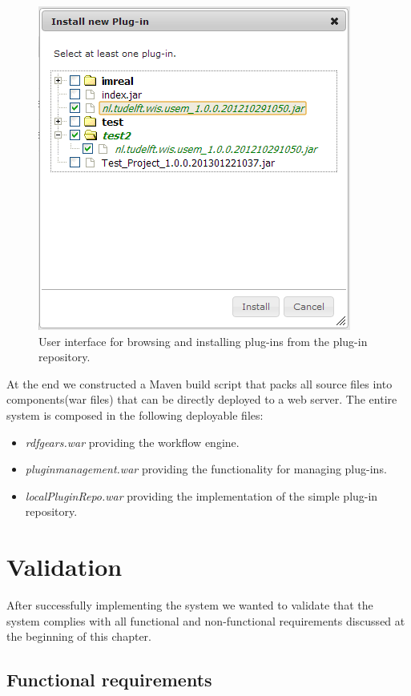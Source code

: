 \begin{figure}[h!]
  \centering
  	\includegraphics[scale=0.6]{plug-in/ui/repo.png}
  \caption{User interface for browsing and installing plug-ins from the plug-in repository.}
  \label{repo_ui}
\end{figure}

At the end we constructed a Maven build script that packs all source files into components(war files) that can be directly deployed to a web server. The entire system is composed in the following deployable files:
\begin{itemize}
	\item \textit{rdfgears.war} providing the workflow engine.
	\item \textit{pluginmanagement.war} providing the functionality for managing plug-ins.
	\item \textit{localPluginRepo.war} providing the implementation of the simple plug-in repository.
\end{itemize}

\section{Validation}

After successfully implementing the system we wanted to validate that the system complies with all functional and non-functional requirements discussed at the beginning of this chapter. 

\subsection{Functional requirements}


